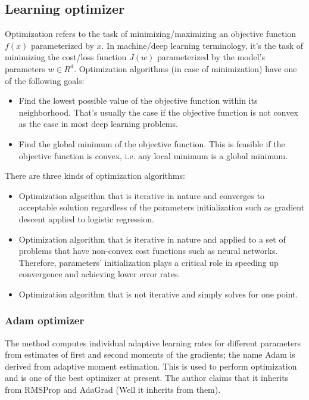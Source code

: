 \subsection{Learning optimizer}

Optimization refers to the task of minimizing/maximizing an objective function $f(x)$ parameterized by $x$. In machine/deep learning terminology, it’s the task of minimizing the cost/loss function $J(w)$ parameterized by the model’s parameters $w \in R^d$. Optimization algorithms (in case of minimization) have one of the following goals:

\begin{itemize}
    \item Find the lowest possible value of the objective function within its neighborhood. That’s usually the case if the objective function is not convex as the case in most deep learning problems.
    \item Find the global minimum of the objective function. This is feasible if the objective function is convex, i.e. any local minimum is a global minimum.
\end{itemize}

There are three kinds of optimization algorithms:

\begin{itemize}
    \item Optimization algorithm that is iterative in nature and converges to acceptable solution regardless of the parameters initialization such as gradient descent applied to logistic regression.
    \item Optimization algorithm that is iterative in nature and applied to a set of problems that have non-convex cost functions such as neural networks. Therefore, parameters’ initialization plays a critical role in speeding up convergence and achieving lower error rates.
    \item Optimization algorithm that is not iterative and simply solves for one point.
\end{itemize}

\subsubsection{Adam optimizer}

The method computes individual adaptive learning rates for different parameters from estimates of first and second moments of the gradients; the name Adam is derived from adaptive moment estimation. This is used to perform optimization and is one of the best optimizer at present. The author claims that it inherits from RMSProp and AdaGrad (Well it inherits from them).\\

